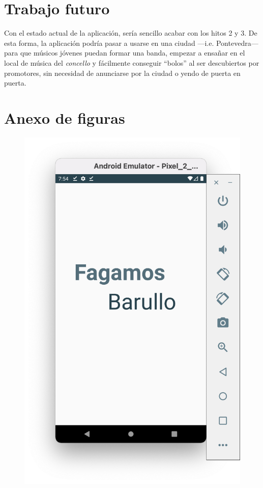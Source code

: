 \documentclass[a4paper,12pt]{article}
\begin{document}
\section{Trabajo futuro}
Con el estado actual de la aplicación, sería sencillo acabar con los hitos 2 y 3. De esta forma, la aplicación podría pasar a usarse en una ciudad ---i.e. Pontevedra--- para que músicos jóvenes puedan formar una banda, empezar a ensañar en el local de música del \textit{concello} y fácilmente conseguir ``bolos'' al ser descubiertos por promotores, sin necesidad de anunciarse por la ciudad o yendo de puerta en puerta.
\section*{Anexo de figuras}
\begin{figure}[H]
	\centering
	\includegraphics[scale=.42]{1.png}
\end{figure}
\end{document}
